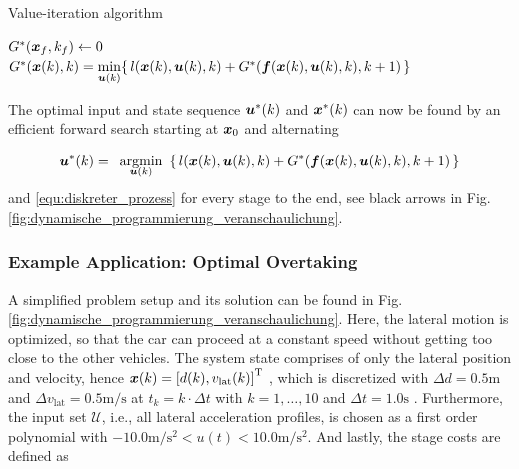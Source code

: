 
\begin{algorithm}
  \caption[Value Iteration]{Value-iteration algorithm}

 \begin{algorithmic}[1]

	\STATE $G^\ast(\boldsymbol{x}_f,k_f) \leftarrow 0$
			\STATE $G^\ast(\boldsymbol{x}(k),k) = \underset{\boldsymbol{u}(k)}{\min}\{\,l(\boldsymbol{x}(k), \boldsymbol{u}(k), k) + G^\ast(\boldsymbol{f}(\boldsymbol{x}(k), \boldsymbol{u}(k), k),k+1)\,\}$
		\ENDFOR
	\ENDFOR
 \label{alg:valueiteration}

 \end{algorithmic}
 \end{algorithm}

The optimal input and state sequence $\boldsymbol{u}^\ast (k)$ and $\boldsymbol{x}^\ast (k)$ can now be found by an efficient forward search starting at $\boldsymbol{x}_0$ and alternating 

\begin{align} \label{equ:navigation_function}
\bs u^\ast(k) = \argmin{\bs u(k)}\{\,l(\bs x(k), \bs u(k), k) + G^\ast(\bs f(\bs x(k), \bs u(k),k), k+1)\,\}
\end{align}
and \eqref{equ:diskreter_prozess} for every stage to the end, see black arrows in  Fig. \ref{fig:dynamische_programmierung_veranschaulichung}.





\subsubsection{Example Application: Optimal Overtaking}\label{S:57.3.3.3}

A simplified problem setup and its solution can be found in Fig. \ref{fig:dynamische_programmierung_veranschaulichung}.
Here, the lateral motion is optimized, so that the car can proceed at a constant speed without getting too close to the other vehicles. 
The system state comprises of only the lateral position and velocity, hence 
$\boldsymbol{x}(k)=\left[d(k),v_\mathrm{lat}(k)\right]^{{\rm T}}$ , which is discretized with $\Delta d=0.5 \mathrm{m}$  and $\Delta v_\mathrm{lat}  =0.5\mathrm{m/s}$  at $t_k=k\cdot \Delta t$ with $k=1,\dots,10$ and $\Delta t=1.0 \mathrm{s}$ . Furthermore, the input set $\mathcal{U}$, i.e., all lateral acceleration profiles, is chosen as a first order polynomial with $-10.0\mathrm{m/s^2} <u(t)< 10.0\mathrm{m/s^2}$. And lastly, the stage costs are defined as

